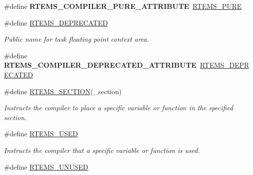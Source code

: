 \begin{DoxyCompactItemize}
\#define {\bfseries R\+T\+E\+M\+S\+\_\+\+C\+O\+M\+P\+I\+L\+E\+R\+\_\+\+P\+U\+R\+E\+\_\+\+A\+T\+T\+R\+I\+B\+U\+TE}~\mbox{\hyperlink{group__RTEMSScoreBaseDefs_gaec99cd3de9d6cdbc517b1af5bf64556b}{R\+T\+E\+M\+S\+\_\+\+P\+U\+RE}}
\item 
\#define \mbox{\hyperlink{group__RTEMSScoreBaseDefs_ga6e7bd1624f0779bd750f1726e15cb910}{R\+T\+E\+M\+S\+\_\+\+D\+E\+P\+R\+E\+C\+A\+T\+ED}}
\begin{DoxyCompactList}\small\item\em Public name for task floating point context area. \end{DoxyCompactList}\item 
\mbox{\label{group__RTEMSScoreBaseDefs_gae887ad9feabb1d7511bd2093599930a0}} 
\#define {\bfseries R\+T\+E\+M\+S\+\_\+\+C\+O\+M\+P\+I\+L\+E\+R\+\_\+\+D\+E\+P\+R\+E\+C\+A\+T\+E\+D\+\_\+\+A\+T\+T\+R\+I\+B\+U\+TE}~\mbox{\hyperlink{group__RTEMSScoreBaseDefs_gab651a076d4d51d50221e7ef7ac99d4e7}{R\+T\+E\+M\+S\+\_\+\+D\+E\+P\+R\+E\+C\+A\+T\+ED}}
\item 
\mbox{\label{group__RTEMSScoreBaseDefs_ga2fa45edb4e822c570e045537dfc9fb44}} 
\#define \mbox{\hyperlink{group__RTEMSScoreBaseDefs_ga2fa45edb4e822c570e045537dfc9fb44}{R\+T\+E\+M\+S\+\_\+\+S\+E\+C\+T\+I\+ON}}(\+\_\+section)
\begin{DoxyCompactList}\small\item\em Instructs the compiler to place a specific variable or function in the specified section. \end{DoxyCompactList}\item 
\mbox{\label{group__RTEMSScoreBaseDefs_ga309a4034166d0175a8dc834dc677bc49}} 
\#define \mbox{\hyperlink{group__RTEMSScoreBaseDefs_ga309a4034166d0175a8dc834dc677bc49}{R\+T\+E\+M\+S\+\_\+\+U\+S\+ED}}
\begin{DoxyCompactList}\small\item\em Instructs the compiler that a specific variable or function is used. \end{DoxyCompactList}\item 
\#define \mbox{\hyperlink{group__RTEMSScoreBaseDefs_ga6794c0ff237a90e837e19f9bbcae4297}{R\+T\+E\+M\+S\+\_\+\+U\+N\+U\+S\+ED}}
\item 
\mbox{\label{group__RTEMSScoreBaseDefs_ga3d59a5636767fc99f89c2a0ed42c46d0}} 

\end{DoxyCompactItemize}
